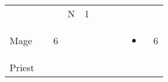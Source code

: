 \documentclass[12pt]{article}
\newcommand{\indexClass}[1]{\index{#1}}
\newcommand{\class}[1]{#1\indexClass{#1}}
\begin{document}
\begin{longtable}[]{@{}llllllllll@{}}
\begin{minipage}[t]{0.06\columnwidth}
\strut\end{minipage} &
\begin{minipage}[t]{0.06\columnwidth}\raggedright\strut
\strut\end{minipage} &
\begin{minipage}[t]{0.06\columnwidth}\raggedright\strut
\strut\end{minipage} &
\begin{minipage}[t]{0.07\columnwidth}\raggedright\strut
N
\strut\end{minipage} &
\begin{minipage}[t]{0.08\columnwidth}\raggedright\strut
1
\strut\end{minipage}\tabularnewline
\begin{minipage}[t]{0.13\columnwidth}\raggedright\strut
\class{Mage}
\strut\end{minipage} &
\begin{minipage}[t]{0.06\columnwidth}\raggedright\strut
\strut\end{minipage} &
\begin{minipage}[t]{0.06\columnwidth}\raggedright\strut
6
\strut\end{minipage} &
\begin{minipage}[t]{0.06\columnwidth}\raggedright\strut
\strut\end{minipage} &
\begin{minipage}[t]{0.06\columnwidth}\raggedright\strut
\strut\end{minipage} &
\begin{minipage}[t]{0.06\columnwidth}\raggedright\strut
\strut\end{minipage} &
\begin{minipage}[t]{0.06\columnwidth}\raggedright\strut
\strut\end{minipage} &
\begin{minipage}[t]{0.06\columnwidth}\raggedright\strut
\strut\end{minipage} &
\begin{minipage}[t]{0.07\columnwidth}\raggedright\strut
\begin{itemize}
\item
\end{itemize}
\strut\end{minipage} &
\begin{minipage}[t]{0.08\columnwidth}\raggedright\strut
6
\strut\end{minipage}\tabularnewline
\begin{minipage}[t]{0.13\columnwidth}\raggedright\strut
\class{Priest}

\end{minipage}
\end{longtable}
\end{document}
